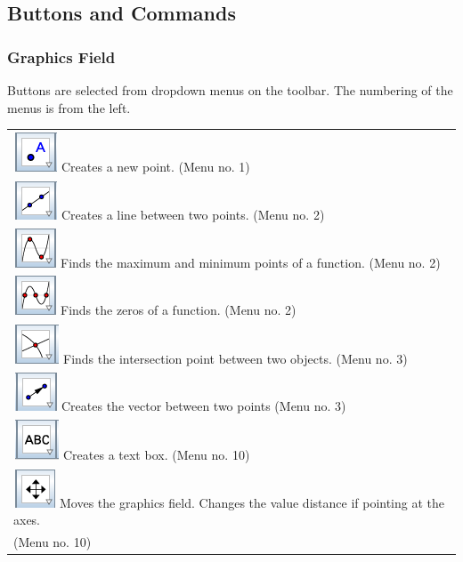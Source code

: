 \newpage
\subsection{Buttons and Commands}

\subsubsection*{Graphics Field}
Buttons are selected from dropdown menus on the toolbar. The numbering of the menus is from the left.\vsk

\begin{tabular}{@{}l}
	\,\includegraphics[scale=0.4]{fig/pkt} Creates a new point. (Menu no. 1) \\
	\,\includegraphics[scale=0.4]{fig/lin} Creates a line between two points. (Menu no. 2)\\	
	\,\includegraphics[scale=0.4]{fig/ekst} Finds the maximum and minimum points of a function. (Menu no. 2)\\
	\,\includegraphics[scale=0.4]{fig/nul} Finds the zeros of a function. (Menu no. 2)	\\
	\,\includegraphics[scale=0.4]{fig/skj} Finds the intersection point between two objects. (Menu no. 3)\\	
	\,\includegraphics[scale=0.4]{fig/vek} Creates the vector between two points (Menu no. 3)\\		
	\,\includegraphics[scale=0.4]{fig/tekst} Creates a text box. (Menu no. 10)\\		
	\,\includegraphics[scale=0.4]{fig/flytt} Moves the graphics field. Changes the value distance if pointing at the axes. \\
	\hspace{1cm}(Menu no. 10)\\			
\end{tabular}

